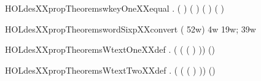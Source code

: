 \newcommand{\HOLdesXXpropTheoremsweakKXXsup}{\UseVerbatim{HOLdesXXpropTheoremsweakKXXsup}}
\begin{SaveVerbatim}{HOLdesXXpropTheoremswkeyOneXXequal}
\HOLTokenTurnstile{} \HOLSymConst{\HOLTokenForall{}}  .
        \HOLSymConst{\HOLTokenConj{}}  \HOLSymConst{\HOLTokenLeq{}}  \HOLSymConst{\HOLTokenImp{}}
       (  ) ( ) \HOLSymConst{=}   (  ) ( )
\end{SaveVerbatim}
\newcommand{\HOLdesXXpropTheoremswkeyOneXXequal}{\UseVerbatim{HOLdesXXpropTheoremswkeyOneXXequal}}
\begin{SaveVerbatim}{HOLdesXXpropTheoremswordSixpXXconvert}
\HOLTokenTurnstile{} \HOLTokenLeftbrace{} \HOLTokenBar{}   \HOLSymConst{\HOLTokenEor{}}  ( \HOLSymConst{\HOLTokenEor{}} 52w) \HOLSymConst{=} 4w\HOLTokenRightbrace{} \HOLSymConst{=} \HOLTokenLeftbrace{}19w; 39w\HOLTokenRightbrace{}
\end{SaveVerbatim}
\newcommand{\HOLdesXXpropTheoremswordSixpXXconvert}{\UseVerbatim{HOLdesXXpropTheoremswordSixpXXconvert}}
\begin{SaveVerbatim}{HOLdesXXpropTheoremsWtextOneXXdef}
\HOLTokenTurnstile{}  \HOLSymConst{=}
   \HOLTokenLeftbrace{} \HOLTokenBar{} \HOLSymConst{\HOLTokenExists{}}.  ( (  (  ) )) \HOLSymConst{=} (\HOLSymConst{,})\HOLTokenRightbrace{}
\end{SaveVerbatim}
\newcommand{\HOLdesXXpropTheoremsWtextOneXXdef}{\UseVerbatim{HOLdesXXpropTheoremsWtextOneXXdef}}
\begin{SaveVerbatim}{HOLdesXXpropTheoremsWtextTwoXXdef}
\HOLTokenTurnstile{}  \HOLSymConst{=}
   \HOLTokenLeftbrace{} \HOLTokenBar{} \HOLSymConst{\HOLTokenExists{}}.  ( (  (  ) )) \HOLSymConst{=} (\HOLSymConst{,})\HOLTokenRightbrace{}
\end{SaveVerbatim}
\newcommand{\HOLdesXXpropTheoremsWtextTwoXXdef}{\UseVerbatim{HOLdesXXpropTheoremsWtextTwoXXdef}}
